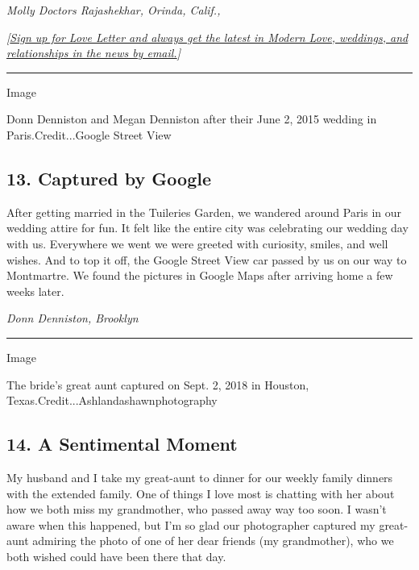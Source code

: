 \emph{Molly Doctors Rajashekhar, Orinda, Calif.,}

\emph{{[}}\href{https://www.nytimes3xbfgragh.onion/newsletters/love-letter?module=inline}{\emph{Sign
up for Love Letter and always get the latest in Modern Love, weddings,
and relationships in the news by email.}}\emph{{]}}

\begin{center}\rule{0.5\linewidth}{\linethickness}\end{center}

Image

Donn Denniston and Megan Denniston after their June 2, 2015 wedding in
Paris.Credit...Google Street View

\hypertarget{13-captured-by-google}{%
\subsection{13. Captured by Google}\label{13-captured-by-google}}

After getting married in the Tuileries Garden, we wandered around Paris
in our wedding attire for fun. It felt like the entire city was
celebrating our wedding day with us. Everywhere we went we were greeted
with curiosity, smiles, and well wishes. And to top it off, the Google
Street View car passed by us on our way to Montmartre. We found the
pictures in Google Maps after arriving home a few weeks later.

\emph{Donn Denniston, Brooklyn}

\begin{center}\rule{0.5\linewidth}{\linethickness}\end{center}

Image

The bride's great aunt captured on Sept. 2, 2018 in Houston,
Texas.Credit...Ashlandashawnphotography

\hypertarget{14-a-sentimental-moment}{%
\subsection{14. A Sentimental Moment}\label{14-a-sentimental-moment}}

My husband and I take my great-aunt to dinner for our weekly family
dinners with the extended family. One of things I love most is chatting
with her about how we both miss my grandmother, who passed away way too
soon. I wasn't aware when this happened, but I'm so glad our
photographer captured my great-aunt admiring the photo of one of her
dear friends (my grandmother), who we both wished could have been there
that day.

